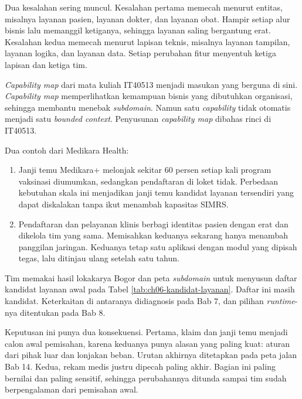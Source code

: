 Dua kesalahan sering muncul. Kesalahan pertama memecah menurut entitas, misalnya layanan pasien,
layanan dokter, dan layanan obat. Hampir setiap alur bisnis lalu memanggil ketiganya, sehingga
layanan saling bergantung erat. Kesalahan kedua memecah menurut lapisan teknis, misalnya layanan
tampilan, layanan logika, dan layanan data. Setiap perubahan fitur menyentuh ketiga lapisan dan
ketiga tim.

\textit{Capability map} dari mata kuliah IT40513 menjadi masukan yang berguna di sini.
\textit{Capability map} memperlihatkan kemampuan bisnis yang dibutuhkan organisasi, sehingga
membantu menebak \textit{subdomain}. Namun satu \textit{capability} tidak otomatis menjadi satu
\textit{bounded context}. Penyusunan \textit{capability map} dibahas rinci di IT40513.

Dua contoh dari Medikara Health:
\begin{enumerate}
  \item Janji temu Medikara+ melonjak sekitar 60 persen setiap kali program vaksinasi diumumkan,
        sedangkan pendaftaran di loket tidak. Perbedaan kebutuhan skala ini menjadikan janji temu
        kandidat layanan tersendiri yang dapat diskalakan tanpa ikut menambah kapasitas SIMRS.
  \item Pendaftaran dan pelayanan klinis berbagi identitas pasien dengan erat dan dikelola tim
        yang sama. Memisahkan keduanya sekarang hanya menambah panggilan jaringan. Keduanya tetap
        satu aplikasi dengan modul yang dipisah tegas, lalu ditinjau ulang setelah satu tahun.
\end{enumerate}

\begin{kasus}[title={Kasus Medikara Health: Daftar Kandidat Layanan Awal}]
  Tim memakai hasil lokakarya Bogor dan peta \textit{subdomain} untuk menyusun daftar kandidat
  layanan awal pada Tabel \ref{tab:ch06-kandidat-layanan}. Daftar ini masih kandidat. Keterkaitan
  di antaranya didiagnosis pada Bab 7, dan pilihan \textit{runtime}-nya ditentukan pada Bab 8.

  Keputusan ini punya dua konsekuensi. Pertama, klaim dan janji temu menjadi calon awal
  pemisahan, karena keduanya punya alasan yang paling kuat: aturan dari pihak luar dan lonjakan
  beban. Urutan akhirnya ditetapkan pada peta jalan Bab 14. Kedua, rekam medis justru dipecah paling
  akhir. Bagian ini paling bernilai dan paling sensitif, sehingga perubahannya ditunda sampai tim
  sudah berpengalaman dari pemisahan awal.
\end{kasus}

